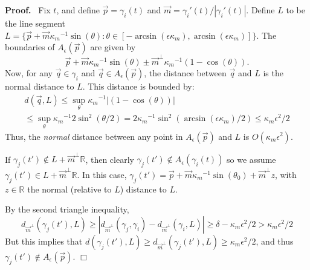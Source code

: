 \documentclass{article}
\newcommand{\nin}{\not\in}
\newenvironment{proof}{
  \noindent\textbf{Proof.}\ }{\hspace*{\fill}
  \begin{math}\Box\end{math}\medskip}
\numberwithin{cntr}{section}
\numberwithin{equation}{section}
\newcommand{\abs}[1]{\left| #1 \right|}%
\newcommand{\RR}[0]{{\mathbb{R}}}
\newcommand{\vp}[0]{{\vec{p}}}
\newcommand{\vq}[0]{{\vec{q}}}
\newcommand{\vm}[0]{{\vec{m}}}
\newcommand{\allowed}[2]{ { A_{#1}(#2) } }
\newcommand{\kmax}{{\kappa_{m}}}
\newcommand{\kmaxi}{{\kmax^{-1}}}
\begin{document}
\begin{proof}
  Fix $t$, and define $\vp=\gamma_{i}(t)$ and $\vm=\gamma_{i}'(t) / \abs{\gamma_{i}'(t)}$. Define $L$ to be the line segment $L= \{ \vp+\vm \kmaxi \sin(\theta) : \theta \in [-\arcsin(\epsilon \kmax),\arcsin(\epsilon \kmax)] \}$. The boundaries of $\allowed{\epsilon}{\vp}$ are given by
\begin{equation*}
  \vp + \vm \kmaxi \sin(\theta) \pm \vm^{\perp} \kmaxi (1-\cos(\theta)).
\end{equation*}
Now, for any $\vq \in \gamma_{i} $ and $\vq \in \allowed{\epsilon}{\vp}$, the distance between $\vq$ and $L$ is the normal distance to $L$. This distance is bounded by:
\begin{multline*}
  d(\vq,L) \leq
  \sup_{\theta} \kmaxi \abs{(1-\cos(\theta)) }\\
  \leq
  \sup_{\theta} \kmaxi 2 \sin^{2}(\theta/2) =
  2\kmaxi \sin^{2}( \arcsin(\epsilon \kmax)/2) \leq \kmax \epsilon^{2}/2
\end{multline*}
Thus, the \emph{normal} distance between any point in $\allowed{\epsilon}{\vp}$ and $L$ is $O(\kmax \epsilon^{2})$.

If $\gamma_{j}(t') \nin L+\vm^{\perp} \RR$, then clearly $\gamma_{j}(t') \nin \allowed{\epsilon}{\gamma_{i}(t)}$ so we assume $\gamma_{j}(t') \in L+\vm^{\perp} \RR$. In this case, $\gamma_{j}(t') = \vp + \vm \kmaxi \sin(\theta_{0}) + \vm^\perp z$, with $z \in \RR$ the normal (relative to $L$) distance to $L$.

By the second triangle inequality,
\begin{equation*}
  d_{\vm^{\perp}}(\gamma_{j}(t'), L) \geq \abs{d_{\vm^{\perp}}(\gamma_{j}, \gamma_{i}) -  d_{\vm^{\perp}}(\gamma_{i}, L)}
  \geq \delta - \kmax \epsilon^{2}/2 > \kmax \epsilon^{2}/2
\end{equation*}
But this implies that $d(\gamma_{j}(t'), L) \geq d_{\vm^{\perp}}(\gamma_{j}(t'), L) \geq \kmax \epsilon^{2}/2$, and thus $\gamma_{j}(t') \nin \allowed{\epsilon}{\vp}$.
\end{proof}






\end{document}

